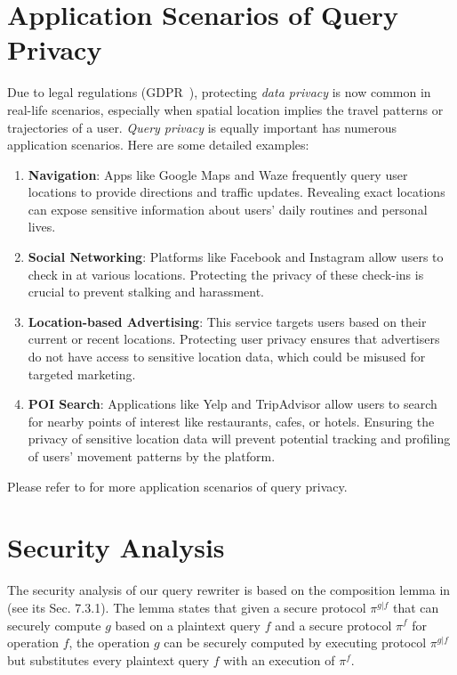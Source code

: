 \appendix
\section{Application Scenarios of Query Privacy}
\label{app:query-privacy-app}

Due to legal regulations (\eg GDPR~\cite{GDPR}), protecting \textit{data privacy} is now common in real-life scenarios, especially when spatial location implies the travel patterns or trajectories of a user. 
\textit{Query privacy} is equally important has numerous application scenarios. Here are some detailed examples:

\begin{enumerate}
    \item \textbf{Navigation}: Apps like Google Maps \cite{googlemaps} and Waze \cite{waze} frequently query user locations to provide directions and traffic updates. Revealing exact locations can expose sensitive information about users' daily routines and personal lives.
    
    \item \textbf{Social Networking}: Platforms like Facebook \cite{facebook} and Instagram \cite{instagram} allow users to check in at various locations. Protecting the privacy of these check-ins is crucial to prevent stalking and harassment.
    
    \item \textbf{Location-based Advertising}: This service targets users based on their current or recent locations. Protecting user privacy ensures that advertisers do not have access to sensitive location data, which could be misused for targeted marketing.

    \item \textbf{POI Search}: Applications like Yelp \cite{yelp} and TripAdvisor \cite{tripadvisor} allow users to search for nearby points of interest like restaurants, cafes, or hotels. Ensuring the privacy of sensitive location data will prevent potential tracking and profiling of users’ movement patterns by the platform.
\end{enumerate} 

Please refer to \cite{DBLP:reference/sp/2018mdp,DBLP:conf/esorics/2009-5599} for more application scenarios of query privacy.

\section{Security Analysis}
\label{app:secure}
The security analysis of our query rewriter is based on the composition lemma in \cite{goldreich2009foundations} (see its Sec. 7.3.1).
The lemma states that given a secure protocol $\pi^{g|f}$ that can securely compute $g$ based on a plaintext query $f$ and a secure protocol $\pi^f$ for operation $f$, the operation $g$ can be securely computed by executing protocol $\pi^{g|f}$ but substitutes every plaintext query $f$ with an execution of $\pi^f$.

